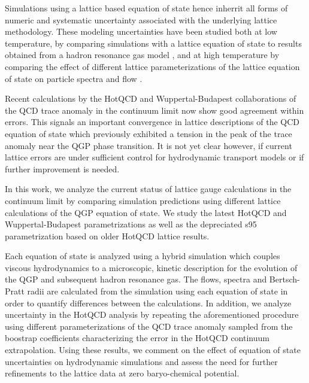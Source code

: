 \documentclass[aps,prc,reprint,amsmath,nofootinbib,superscriptaddress]{revtex4-1}
\begin{document}
Simulations using a lattice based equation of state hence inherrit all forms of numeric and systematic uncertainty associated with the underlying lattice methodology. These modeling uncertainties have been studied both at low temperature, by comparing simulations with a lattice equation of state to results obtained from a hadron resonance gas model \cite{Huovinen:2009yb}, and at high temperature by comparing the effect of different lattice parameterizations of the lattice equation of state on particle spectra and flow \cite{Huovinen:2005gy, Huovinen:2009yb}. 


Recent calculations by the HotQCD and Wuppertal-Budapest collaborations of the QCD trace anomaly in the continuum limit now show good agreement within errors. 
This signals an important convergence in lattice descriptions of the QCD equation of state which previously exhibited a tension in the peak of the trace anomaly near the QGP phase transition. 
It is not yet clear however, if current lattice errors are under sufficient control for hydrodynamic transport models or if further improvement is needed.  

In this work, we analyze the current status of lattice gauge calculations in the continuum limit by comparing simulation predictions using different lattice calculations of the QGP equation of state. 
We study the latest HotQCD and Wuppertal-Budapest parametrizations as well as the depreciated s95 parametrization based on older HotQCD lattice results. 

Each equation of state is analyzed using a hybrid simulation which couples viscous hydrodynamics to a microscopic, kinetic description for the evolution of the QGP and subsequent hadron resonance gas. 
The flows, spectra and Bertsch-Pratt radii are calculated from the simulation using each equation of state in order to quantify differences between the calculations. 
In addition, we analyze uncertainty in the HotQCD analysis by repeating the aforementioned procedure using different parameterizations of the QCD trace anomaly sampled from the boostrap coefficients characterizing the error in the HotQCD continuum extrapolation. 
Using these results, we comment on the effect of equation of state uncertainties on hydrodynamic simulations and assess the need for further refinements to the lattice data at zero baryo-chemical potential.
\end{document}
